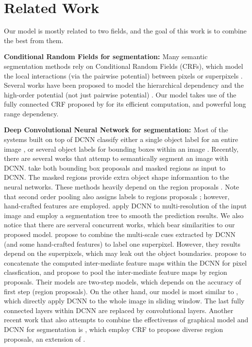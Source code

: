 \section{Related Work}
Our model is mostly related to two fields, and the goal of this work is to combine the best from them.

{\bf{Conditional Random Fields for segmentation: }} Many semantic segmentation methods rely on Conditional Random Fields (CRFs), which model the local interactions (via the pairwise potential) between pixels \citep{rother2004grabcut} or superpixels \citep{lucchi2011spatial}. Several works have been proposed to model the hierarchical dependency \citep{he2004multiscale, ladicky2009associative, lempitsky2011pylon} and the high-order potential (not just pairwise potential) \citep{delong2012fast, gonfaus2010harmony, kohli2009robust, krahenbuhl2011efficient}. Our model takes use of the fully connected CRF proposed by \citet{krahenbuhl2011efficient} for its efficient computation, and powerful long range dependency.

{\bf{Deep Convolutional Neural Network for segmentation: }} Most of the systems built on top of DCNN classify either a single object label for an entire image \citep{KrizhevskyNIPS2013, simonyan2014very, szegedy2014going}, or several object labels for bounding boxes within an image \citep{papandreou2014untangling, girshick2014rcnn}. Recently, there are several works that attemp to semantically segment an image with DCNN. \citet{girshick2014rcnn, hariharan2014simultaneous} take both bounding box proposals and masked regions as input to DCNN. The masked regions provide extra object shape informantion to the neural networks. These methods heavily depend on the region proposals \citep{arbelaez2014multiscale, Uijlings13}. Note that second order pooling \citep{carreira2012semantic} also assigns labels to regions proposals \citep{carreira2012cpmc}; however, hand-crafted features are employed. \citet{farabet2013learning} apply DCNN to multi-resolution of the input image and employ a segmentation tree to smooth the prediction results. We also notice that there are serveral concurrent works, which bear similarities to our proposed model. \citet{mostajabi2014feedforward} propose to combine the multi-scale cues extracted by DCNN (and some hand-crafted features) to label one superpixel. However, they results depend on the superpixels, which may leak out the object boundaries. \citet{hariharan2014hypercolumns} propose to concatenate the computed inter-mediate feature maps within the DCNN for pixel classfication, and \citet{dai2014convolutional} propose to pool the inter-mediate feature maps by region proposals. Their models are two-step models, which depends on the accuracy of first step (\ie region proposals). On the other hand, our model is most similar to \citet{long2014fully, eigen2014predicting}, which directly apply DCNN to the whole image in sliding window. The last fully connected layers within DCNN are replaced by convolutional layers. Another recent work that also attempts to combine the effectivenss of graphical model and DCNN for segmentation is \citet{cogswell2014combining}, which employ CRF to propose diverse region proposals, an extension of \citet{yadollahpour2013discriminative}.


